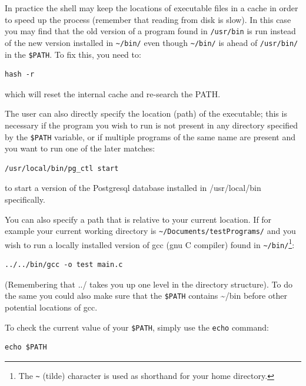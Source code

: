 \documentclass[11pt]{article}
\begin{document}
In practice the shell may keep the locations of executable files in
a cache in order to speed up the process
(remember that reading from disk is slow). In this case you may find
that the old version of a program found in \texttt{/usr/bin} is run instead of the 
new version installed in \texttt{\textasciitilde{}/bin/} even though
\texttt{\textasciitilde{}/bin/} is ahead of \texttt{/usr/bin/} in the \texttt{\$PATH}. To fix this, you need to:

\begin{verbatim}
hash -r
\end{verbatim}

which will reset the internal cache and re-search the PATH.

The user can also directly specify the location (path) of the
executable; this is necessary if the program you wish to run is not
present in any directory specified by the \texttt{\$PATH} variable, or if
multiple programs of the same name are present and you want to run one
of the later matches:

\begin{verbatim}
/usr/local/bin/pg_ctl start
\end{verbatim}

to start a version of the Postgresql database installed in
/usr/local/bin specifically.

You can also specify a path that is relative to your current location.
If for example your current working directory is
\texttt{\textasciitilde{}/Documents/testPrograms/} and you wish to run a locally installed
version of gcc (gnu C compiler) found in \texttt{\textasciitilde{}/bin/}\footnote{The \texttt{\textasciitilde{}} (tilde) character is used as shorthand for your home
directory.}:

\begin{verbatim}
../../bin/gcc -o test main.c
\end{verbatim}


(Remembering that ../ takes you up one level in the directory
structure). To do the same you could also make sure that the \texttt{\$PATH}
contains \textasciitilde{}/bin before other potential locations of gcc.

To check the current value of your \texttt{\$PATH}, simply use the \texttt{echo} command:

\begin{verbatim}
echo $PATH
\end{verbatim}
\end{document}
